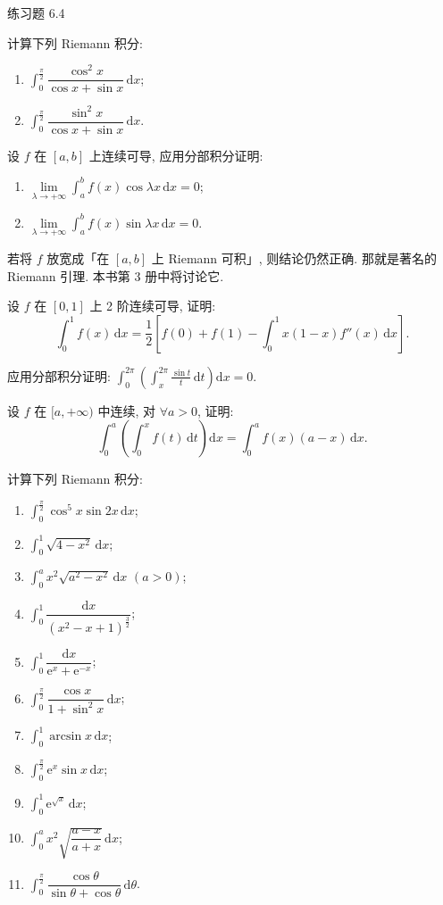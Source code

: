 \begin{exblock}{练习题 6.4}
  \item 计算下列 Riemann 积分:
  \begin{enumerate}[label=(\arabic*)]
    \item $\int_{0}^{\frac{\pi}{2}}\dfrac{\cos^{2}x}{\cos x+\sin x}\,\mathrm{d}x$;
    \item $\int_{0}^{\frac{\pi}{2}}\dfrac{\sin^{2}x}{\cos x+\sin x}\,\mathrm{d}x$.
  \end{enumerate}

  \item 设 $f$ 在 $[a,b]$ 上连续可导, 应用分部积分证明:
  \begin{enumerate}[label=(\arabic*)]
    \item $\lim\limits_{\lambda\to+\infty}\int_{a}^{b}f(x)\cos\lambda x\,\mathrm{d}x=0$;
    \item $\lim\limits_{\lambda\to+\infty}\int_{a}^{b}f(x)\sin\lambda x\,\mathrm{d}x=0$.
  \end{enumerate}
  若将 $f$ 放宽成「在 $[a,b]$ 上 Riemann 可积」, 则结论仍然正确. 那就是著名的 Riemann 引理. 本书第 3 册中将讨论它.

  \item 设 $f$ 在 $[0,1]$ 上 2 阶连续可导, 证明:
  \[
  \int_{0}^{1}f(x)\,\mathrm{d}x=\frac{1}{2}\left[f(0)+f(1)-\int_{0}^{1}x(1-x)f''(x)\,\mathrm{d}x\right].
\]

  \item 应用分部积分证明: $\int_{0}^{2\pi}\left(\int_{x}^{2\pi}\frac{\sin t}{t}\,\mathrm{d}t\right)\mathrm{d}x=0$.

  \item 设 $f$ 在 $[a,+\infty)$ 中连续, 对 $\forall a>0$, 证明:
  \[
  \int_{0}^{a}\left(\int_{0}^{x}f(t)\,\mathrm{d}t\right)\mathrm{d}x=\int_{0}^{a}f(x)(a-x)\,\mathrm{d}x.
\]

  \item 计算下列 Riemann 积分:
  \begin{enumerate}[label=(\arabic*)]
    \item $\int_{0}^{\frac{\pi}{2}}\cos^{5}x\sin2x\,\mathrm{d}x$;
    \item $\int_{0}^{1}\sqrt{4-x^{2}}\,\mathrm{d}x$;
    \item $\int_{0}^{a}x^{2}\sqrt{a^{2}-x^{2}}\,\mathrm{d}x$ $(a>0)$;
    \item $\int_{0}^{1}\dfrac{\mathrm{d}x}{(x^{2}-x+1)^{\frac{3}{2}}}$;
    \item $\int_{0}^{1}\dfrac{\mathrm{d}x}{\mathrm{e}^{x}+\mathrm{e}^{-x}}$;
    \item $\int_{0}^{\frac{\pi}{2}}\dfrac{\cos x}{1+\sin^{2}x}\,\mathrm{d}x$;
    \item $\int_{0}^{1}\arcsin x\,\mathrm{d}x$;
    \item $\int_{0}^{\frac{\pi}{2}}\mathrm{e}^{x}\sin x\,\mathrm{d}x$;
    \item $\int_{0}^{1}\mathrm{e}^{\sqrt{x}}\,\mathrm{d}x$;
    \item $\int_{0}^{a}x^{2}\sqrt{\dfrac{a-x}{a+x}}\,\mathrm{d}x$;
    \item $\int_{0}^{\frac{\pi}{2}}\dfrac{\cos\theta}{\sin\theta+\cos\theta}\,\mathrm{d}\theta$.
  \end{enumerate}


\end{exblock}

